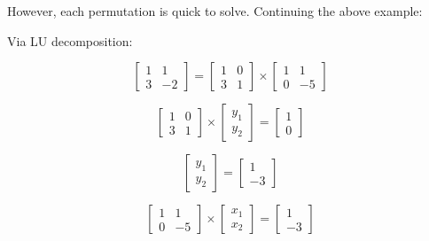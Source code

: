 \documentclass[a4paper, 12pt]{article}
\begin{document}
However, each permutation is quick to solve. Continuing the above example:

\vspace{1.5em}

\begin{minipage}{0.4\textwidth}
	\begin{center}
		Via LU decomposition:
	\end{center}
	\begin{equation*}
	\begin{bmatrix}
	1 & 1 \\
	3 & -2
	\end{bmatrix}
	=
	\begin{bmatrix}
	1 & 0 \\
	3 & 1
	\end{bmatrix}
	\times
	\begin{bmatrix}
	1 & 1\\
	0 & -5
	\end{bmatrix}
	\end{equation*}
	
	\begin{equation*}
	\begin{bmatrix}
	1 & 0 \\
	3 & 1
	\end{bmatrix}
	\times
	\begin{bmatrix}
	y_1 \\
	y_2
	\end{bmatrix}
	=
	\begin{bmatrix}
	1 \\
	0
	\end{bmatrix}
	\end{equation*}
	
	\begin{equation*}
	\begin{bmatrix}
	y_1 \\
	y_2
	\end{bmatrix}
	=
	\begin{bmatrix}
	1 \\
	-3
	\end{bmatrix}
	\end{equation*}
	
	\begin{equation*}
	\begin{bmatrix}
	1 & 1 \\
	0 & -5
	\end{bmatrix}
	\times
	\begin{bmatrix}
	x_1 \\
	x_2
	\end{bmatrix}
	=
	\begin{bmatrix}
	1 \\
	-3
	\end{bmatrix}
	\end{equation*}
	

\end{minipage}
\end{document}
